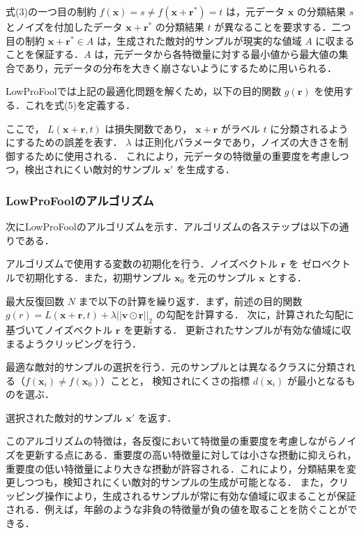 式(3)の一つ目の制約 $f(\bm{x}) = s \neq f(\bm{x}+\bm{r}^*) = t$ は，元データ $\bm{x}$ の分類結果 $s$ とノイズを付加したデータ $\bm{x}+\bm{r}^*$ の分類結果 $t$ が異なることを要求する．二つ目の制約 $\bm{x}+\bm{r}^* \in A$ は，生成された敵対的サンプルが現実的な値域 $A$ に収まることを保証する．$A$ は，元データから各特徴量に対する最小値から最大値の集合であり，元データの分布を大きく崩さないようにするために用いられる．

LowProFoolでは上記の最適化問題を解くため，以下の目的関数 $g(\bm{r})$ を使用する．これを式(5)を定義する．


ここで， $L(\bm{x}+\bm{r}, t)$ は損失関数であり， $\bm{x}+\bm{r}$ がラベル $t$ に分類されるようにするための誤差を表す． $\lambda$ は正則化パラメータであり，ノイズの大きさを制御するために使用される．
これにより，元データの特徴量の重要度を考慮しつつ，検出されにくい敵対的サンプル $\bm{x}'$ を生成する．


\subsubsection{LowProFoolのアルゴリズム}
次にLowProFoolのアルゴリズムを示す．アルゴリズムの各ステップは以下の通りである．
\begin{algorithm_step}
    \item[Step 1)] アルゴリズムで使用する変数の初期化を行う．ノイズベクトル $\bm{r}$ を
        ゼロベクトルで初期化する．また，初期サンプル $\bm{x}_0$ を元のサンプル $\bm{x}$ とする．
    
    \item[Step 2)] 最大反復回数 $N$ まで以下の計算を繰り返す．まず，前述の目的関数 
        $g(r) = L(\bm{x}+\bm{r}, t) + \lambda ||\bm{v} \odot \bm{r}||_2$ の勾配を計算する．
        次に，計算された勾配に基づいてノイズベクトル $\bm{r}$ を更新する．
        更新されたサンプルが有効な値域に収まるようクリッピングを行う．
    
    \item[Step 3)] 最適な敵対的サンプルの選択を行う．元のサンプルとは異なるクラスに分類される（$f(\bm{x}_i) \neq f(\bm{x}_0)$）ことと，
        検知されにくさの指標 $d(\bm{x}_i)$ が最小となるものを選ぶ．
    
    \item[Step 4)] 選択された敵対的サンプル $\bm{x}'$ を返す．
    \end{algorithm_step}


このアルゴリズムの特徴は，各反復において特徴量の重要度を考慮しながらノイズを更新する点にある．重要度の高い特徴量に対しては小さな摂動に抑えられ，重要度の低い特徴量により大きな摂動が許容される．これにより，分類結果を変更しつつも，検知されにくい敵対的サンプルの生成が可能となる．
また，クリッピング操作により，生成されるサンプルが常に有効な値域に収まることが保証される．例えば，年齢のような非負の特徴量が負の値を取ることを防ぐことができる．


